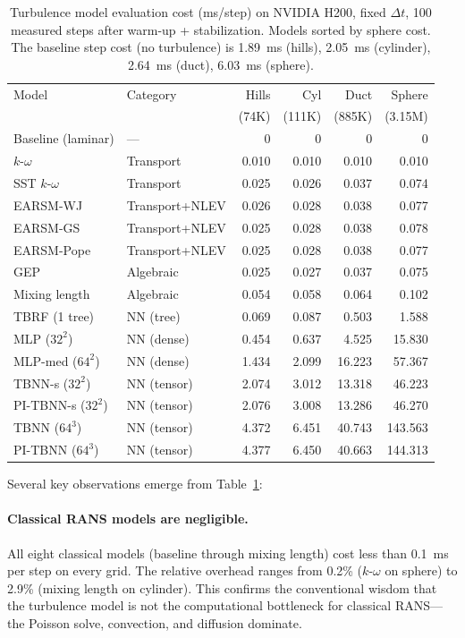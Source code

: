 \begin{table}[htbp]
\centering
\caption{Turbulence model evaluation cost (ms/step) on NVIDIA H200, fixed $\Delta t$, 100 measured steps after warm-up + stabilization. Models sorted by sphere cost. The baseline step cost (no turbulence) is 1.89~ms (hills), 2.05~ms (cylinder), 2.64~ms (duct), 6.03~ms (sphere).}
\label{tab:turb_cost_all}
\begin{tabular}{llrrrr}
\toprule
Model & Category & Hills & Cyl & Duct & Sphere \\
      &          & (74K) & (111K) & (885K) & (3.15M) \\
\midrule
Baseline (laminar) & --- & 0 & 0 & 0 & 0 \\
$k$-$\omega$       & Transport & 0.010 & 0.010 & 0.010 & 0.010 \\
SST $k$-$\omega$   & Transport & 0.025 & 0.026 & 0.037 & 0.074 \\
EARSM-WJ           & Transport+NLEV & 0.026 & 0.028 & 0.038 & 0.077 \\
EARSM-GS           & Transport+NLEV & 0.025 & 0.028 & 0.038 & 0.078 \\
EARSM-Pope         & Transport+NLEV & 0.025 & 0.028 & 0.038 & 0.077 \\
GEP                & Algebraic & 0.025 & 0.027 & 0.037 & 0.075 \\
Mixing length      & Algebraic & 0.054 & 0.058 & 0.064 & 0.102 \\
\midrule
TBRF (1 tree)      & NN (tree) & 0.069 & 0.087 & 0.503 & 1.588 \\
MLP ($32^2$)       & NN (dense) & 0.454 & 0.637 & 4.525 & 15.830 \\
MLP-med ($64^2$)   & NN (dense) & 1.434 & 2.099 & 16.223 & 57.367 \\
TBNN-s ($32^2$)    & NN (tensor) & 2.074 & 3.012 & 13.318 & 46.223 \\
PI-TBNN-s ($32^2$) & NN (tensor) & 2.076 & 3.008 & 13.286 & 46.270 \\
TBNN ($64^3$)      & NN (tensor) & 4.372 & 6.451 & 40.743 & 143.563 \\
PI-TBNN ($64^3$)   & NN (tensor) & 4.377 & 6.450 & 40.663 & 144.313 \\
\bottomrule
\end{tabular}
\end{table}

Several key observations emerge from Table~\ref{tab:turb_cost_all}:

\paragraph{Classical RANS models are negligible.}
All eight classical models (baseline through mixing length) cost less than 0.1~ms per step on every grid.
The relative overhead ranges from 0.2\% ($k$-$\omega$ on sphere) to 2.9\% (mixing length on cylinder).
This confirms the conventional wisdom that the turbulence model is not the computational bottleneck for classical RANS---the Poisson solve, convection, and diffusion dominate.

